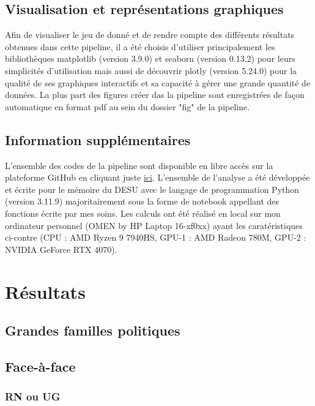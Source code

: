 \documentclass[11pt]{article}
\begin{document}
        \subsection*{Visualisation et représentations graphiques}
            Afin de visualiser le jeu de donné et de rendre compte des différents résultats obtenues dans cette pipeline, il a été choisis d'utiliser principalement les bibliothèques matplotlib (version 3.9.0) et seaborn (version 0.13.2) pour leurs simplicités d'utilisation mais aussi de découvrir plotly (version 5.24.0) pour la qualité de ses graphiques interactifs et sa capacité à gérer une grande quantité de données. La plus part des figures créer das la pipeline sont enregistrées de façon automatique en format pdf au sein du dossier "fig" de la pipeline.
            
        \subsection*{Information supplémentaires}
            L'ensemble des codes de la pipeline sont disponible en libre accès sur la plateforme GitHub en cliquant juste \href{https://github.com/alexandre-laine/Pipeline_Elections_Legislatives}{ici}. L'ensemble de l'analyse a été développée et écrite pour le mémoire du DESU avec le langage de programmation Python (version 3.11.9) majoritairement sous la forme de notebook appellant des fonctions écrite par mes soins. Les calculs ont été réalisé en local sur mon ordinateur personnel (OMEN by HP Laptop 16-xf0xx) ayant les caratéristiques ci-contre (CPU : AMD Ryzen 9 7940HS, GPU-1 : AMD Radeon 780M, GPU-2 : NVIDIA GeForce RTX 4070).

    \newpage
    \section{Résultats}
            
        \subsection*{Grandes familles politiques}

        \subsection*{Face-à-face}
            \subsubsection*{RN ou UG}
\end{document}
